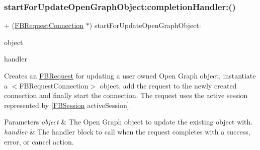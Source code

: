 \subsubsection{\texorpdfstring{start\+For\+Update\+Open\+Graph\+Object\+:completion\+Handler\+:()}{startForUpdateOpenGraphObject:completionHandler:()}\hspace{0.1cm}{\footnotesize\ttfamily [5/5]}}
{\footnotesize\ttfamily + (\hyperlink{interfaceFBRequestConnection}{F\+B\+Request\+Connection} $\ast$) start\+For\+Update\+Open\+Graph\+Object\+: \begin{DoxyParamCaption}\item[{(id$<$ \hyperlink{protocolFBOpenGraphObject-p}{F\+B\+Open\+Graph\+Object} $>$)}]{object }\item[{completionHandler:(F\+B\+Request\+Handler)}]{handler }\end{DoxyParamCaption}}

Creates an {\ttfamily \hyperlink{interfaceFBRequest}{F\+B\+Request}} for updating a user owned Open Graph object, instantiate a $<$\+F\+B\+Request\+Connection$>$ object, add the request to the newly created connection and finally start the connection. The request uses the active session represented by {\ttfamily \mbox{[}\hyperlink{interfaceFBSession}{F\+B\+Session} active\+Session\mbox{]}}.


\begin{DoxyParams}{Parameters}
{\em object} & The Open Graph object to update the existing object with.\\
\hline
{\em handler} & The handler block to call when the request completes with a success, error, or cancel action. \\
\hline
\end{DoxyParams}
\mbox{\label{interfaceFBRequestConnection_ab5cf9ca8b5ab176a3d46fdf8db08ddf8}} 
